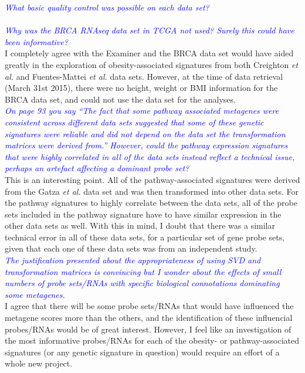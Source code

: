 \documentclass[a4paper, 12pt]{article}
\begin{document}
\noindent
\textcolor{blue}{
	\textit{What basic quality control was possible on each data set?
	}
}\\

\noindent
\\

\noindent
\textcolor{blue}{
	\textit{Why was the BRCA RNAseq data set in TCGA not used?
	Surely this could have been informative?
	}
}\\

\noindent
I completely agree with the Examiner and the BRCA data set would have aided greatly in the exploration of obesity-associated signatures from both Creighton \textit{et al.} and Fuentes-Mattei \textit{et al.} data sets.
However, at the time of data retrieval (March 31st 2015), there were no height, weight or BMI information for the BRCA data set, and could not use the data set for the analyses.
\\

\noindent
\textcolor{blue}{
	\textit{On page 93 you say ``The fact that some pathway associated metagenes were consistent across different data sets suggested that some of these genetic signatures were reliable and did not depend on the data set the transformation matrices were derived from.''
	However, could the pathway expression signatures that were highly correlated in all of the  data sets instead reflect a technical issue, perhaps an artefact affecting a dominant probe set?
	}
}\\

\noindent
This is an interesting point.
All of the pathway-associated signatures were derived from the Gatza \textit{et al.} data set and was then transformed into other data sets.
For the pathway signatures to highly correlate between the data sets, all of the probe sets included in the pathway signature have to have similar expression in the other data sets as well.
With this in mind, I doubt that there was a similar technical error in all of these data sets, for a particular set of gene probe sets, given that each one of these data sets was from an independent study.
\\

\noindent
\textcolor{blue}{
	\textit{The justification presented about the appropriateness of using SVD and transformation matrices is convincing but I wonder about the effects of small numbers of probe sets/RNAs with specific biological connotations dominating some metagenes.
	}
}\\

\noindent
I agree that there will be some probe sets/RNAs that would have influenced the metagene scores more than the others, and the identification of these influencial probes/RNAs would be of great interest.
However, I feel like an investigation  of the most informative probes/RNAs for each of the obesity- or pathway-associated signatures (or any genetic signature in question) would require an effort of a whole new project.
\\
\end{document}
